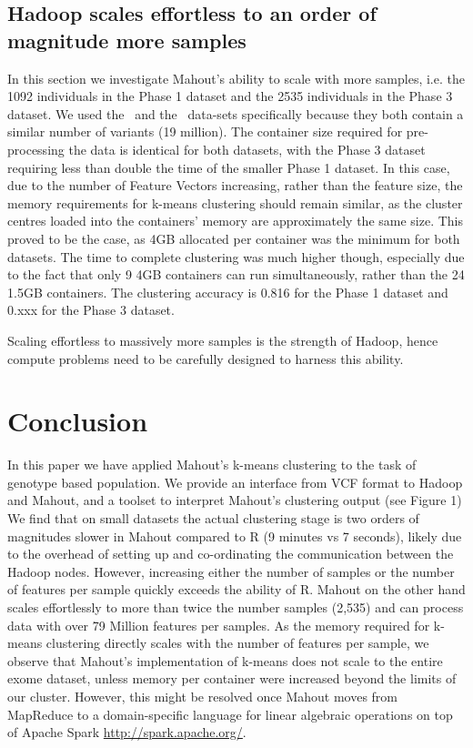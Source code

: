 \documentclass{bioinfo}
\begin{document}
\subsection*{Hadoop scales effortless to an order of magnitude more samples}
In this section we investigate Mahout's ability to scale with more samples, i.e. the 1092 individuals in the Phase 1 dataset and the 2535 individuals in the Phase 3 dataset.
We used the \SevenPhaseone\ and the \ThreePhasethree\ data-sets specifically because they both contain a similar number of variants (19 million).
The container size required for pre-processing the data is identical for both datasets, with the Phase 3 dataset requiring less than double the time of the smaller Phase 1 dataset.
In this case, due to the number of Feature Vectors increasing, rather than the feature size, the memory requirements for k-means clustering should remain similar, as the cluster centres loaded into the containers' memory are approximately the same size.
This proved to be the case, as 4GB allocated per container was the minimum for both datasets. The time to complete clustering was much higher though,
especially due to the fact that only 9 4GB containers can run simultaneously, rather than the 24 1.5GB containers. 
The clustering accuracy is 0.816 for the Phase 1 dataset and 0.xxx for the Phase 3 dataset.

Scaling effortless to massively more samples is the strength of Hadoop, hence compute problems need to be carefully designed to harness this ability.  


\section*{Conclusion}
In this paper we have applied Mahout's k-means clustering to the task of genotype based population. 
We provide an interface from VCF format to Hadoop and Mahout, and a toolset to interpret Mahout's clustering output (see Figure 1)
We find that on small datasets the actual clustering stage is two orders of magnitudes slower in Mahout compared to R (9 minutes vs 7 seconds), likely due to the overhead of setting up and co-ordinating the communication between the Hadoop nodes. 
However, increasing either the number of samples or the number of features per sample quickly exceeds the ability of R.
Mahout on the other hand scales effortlessly to more than twice the number samples (2,535) and can process data with over 79 Million features per samples.
As the memory required for k-means clustering directly scales with the number of features per sample, we observe that Mahout's implementation
of k-means does not scale to the entire exome dataset, unless memory per container were increased beyond the limits of our cluster.
However, this might be resolved once Mahout moves from MapReduce to a domain-specific language for linear algebraic operations on top of Apache Spark \url{http://spark.apache.org/}.
\end{document}
